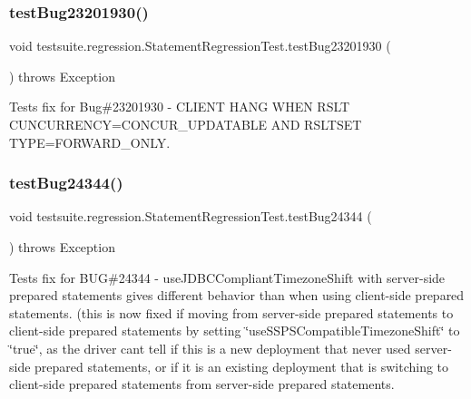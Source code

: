 \subsubsection{\texorpdfstring{test\+Bug23201930()}{testBug23201930()}}
{\footnotesize\ttfamily void testsuite.\+regression.\+Statement\+Regression\+Test.\+test\+Bug23201930 (\begin{DoxyParamCaption}{ }\end{DoxyParamCaption}) throws Exception}

Tests fix for Bug\#23201930 -\/ C\+L\+I\+E\+NT H\+A\+NG W\+H\+EN R\+S\+LT C\+U\+N\+C\+U\+R\+R\+E\+N\+CY=C\+O\+N\+C\+U\+R\+\_\+\+U\+P\+D\+A\+T\+A\+B\+LE A\+ND R\+S\+L\+T\+S\+ET T\+Y\+PE=F\+O\+R\+W\+A\+R\+D\+\_\+\+O\+N\+LY. \mbox{\label{classtestsuite_1_1regression_1_1_statement_regression_test_a4da675927e9f55846b0ea0781c439c48}} 
\subsubsection{\texorpdfstring{test\+Bug24344()}{testBug24344()}}
{\footnotesize\ttfamily void testsuite.\+regression.\+Statement\+Regression\+Test.\+test\+Bug24344 (\begin{DoxyParamCaption}{ }\end{DoxyParamCaption}) throws Exception}

Tests fix for B\+UG\#24344 -\/ use\+J\+D\+B\+C\+Compliant\+Timezone\+Shift with server-\/side prepared statements gives different behavior than when using client-\/side prepared statements. (this is now fixed if moving from server-\/side prepared statements to client-\/side prepared statements by setting \char`\"{}use\+S\+S\+P\+S\+Compatible\+Timezone\+Shift\char`\"{} to \char`\"{}true\char`\"{}, as the driver can\textquotesingle{}t tell if this is a new deployment that never used server-\/side prepared statements, or if it is an existing deployment that is switching to client-\/side prepared statements from server-\/side prepared statements.


